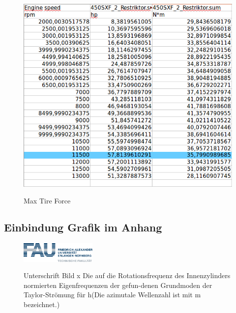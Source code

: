 \begin{figure}[hb!]
	\caption{Max Tire Force}
	\includegraphics[width=350pt]{Abbildungen/Engine_power.png}
	\label{fig:maxTireForce}
\end{figure}



 \subsection*{Einbindung Grafik im Anhang}
  \begin{figure}[h!]
  \begin{centering}
  {\includegraphics[width=0.33\textwidth]{Abbildungen/fau.png}}
   \caption{Unterschrift Bild x Die auf die Rotationsfrequenz des Innenzylinders normierten Eigenfrequenzen der gefun-denen Grundmoden der Taylor-Strömung für h(Die azimutale Wellenzahl ist mit m  bezeichnet.)}
  \end{centering}
  \end{figure}








